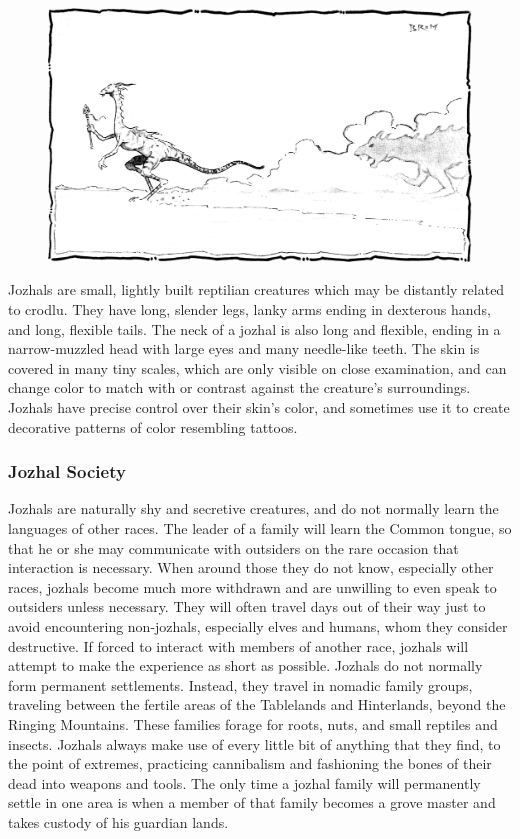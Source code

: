 \begin{figure}[t!]
\centering
\includegraphics[width=\textwidth]{images/jozhal.png}
\WOTC
\end{figure}

Jozhals are small, lightly built reptilian creatures which may be distantly related to crodlu. They have long, slender legs, lanky arms ending in dexterous hands, and long, flexible tails. The neck of a jozhal is also long and flexible, ending in a narrow-muzzled head with large eyes and many needle-like teeth. The skin is covered in many tiny scales, which are only visible on close examination, and can change color to match with or contrast against the creature's surroundings. Jozhals have precise control over their skin's color, and sometimes use it to create decorative patterns of color resembling tattoos.

\subsubsection{Jozhal Society}
Jozhals are naturally shy and secretive creatures, and do not normally learn the languages of other races. The leader of a family will learn the Common tongue, so that he or she may communicate with outsiders on the rare occasion that interaction is necessary. When around those they do not know, especially other races, jozhals become much more withdrawn and are unwilling to even speak to outsiders unless necessary. They will often travel days out of their way just to avoid encountering non-jozhals, especially elves and humans, whom they consider destructive. If forced to interact with members of another race, jozhals will attempt to make the experience as short as possible. Jozhals do not normally form permanent settlements. Instead, they travel in nomadic family groups, traveling between the fertile areas of the Tablelands and Hinterlands, beyond the Ringing Mountains. These families forage for roots, nuts, and small reptiles and insects. Jozhals always make use of every little bit of anything that they find, to the point of extremes, practicing cannibalism and fashioning the bones of their dead into weapons and tools. The only time a jozhal family will permanently settle in one area is when a member of that family becomes a grove master and takes custody of his guardian lands.

